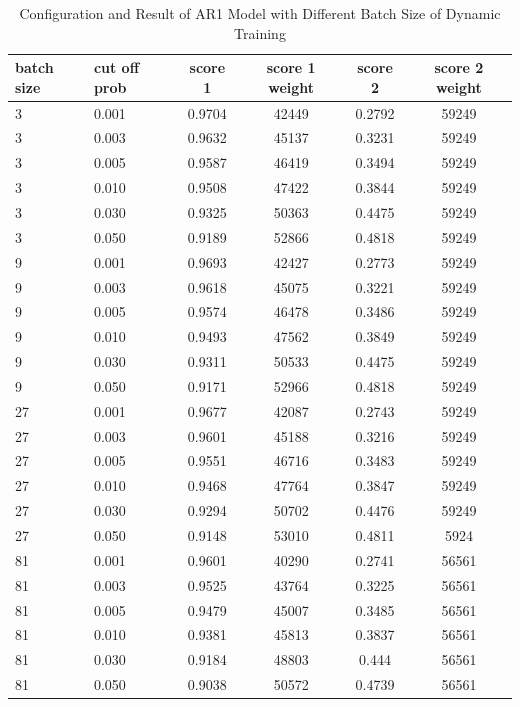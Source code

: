 \documentclass{article}
\begin{document}
\begin{table}[htbp]
  \begin{center}
    \caption{Configuration and Result of AR1 Model with Different Batch Size of Dynamic Training}
    \label{tab:tab1.5.2}
    \begin{tabular}{l|l|*{4}{c}}
      \textbf{batch size} & \textbf{cut off prob} & \textbf{score 1} & \textbf{score 1 weight} & \textbf{score 2} & \textbf{score 2 weight} \\
      \hline
      3 & 0.001 & 0.9704 & 42449 & 0.2792 & 59249\\
      3 & 0.003 & 0.9632 & 45137 & 0.3231 & 59249\\
      3 & 0.005 & 0.9587 & 46419 & 0.3494 & 59249\\
      3 & 0.010 & 0.9508 & 47422 & 0.3844 & 59249\\
      3 & 0.030 & 0.9325 & 50363 & 0.4475 & 59249\\
      3 & 0.050 & 0.9189 & 52866 & 0.4818 & 59249\\
      9 & 0.001 & 0.9693 & 42427 & 0.2773 & 59249\\
      9 & 0.003 & 0.9618 & 45075 & 0.3221 & 59249\\
      9 & 0.005 & 0.9574 & 46478 & 0.3486 & 59249\\
      9 & 0.010 & 0.9493 & 47562 & 0.3849 & 59249\\
      9 & 0.030 & 0.9311 & 50533 & 0.4475 & 59249\\
      9 & 0.050 & 0.9171 & 52966 & 0.4818 & 59249\\
      27 & 0.001 & 0.9677 & 42087 & 0.2743 & 59249\\
      27 & 0.003 & 0.9601 & 45188 & 0.3216 & 59249\\
      27 & 0.005 & 0.9551 & 46716 & 0.3483 & 59249\\
      27 & 0.010 & 0.9468 & 47764 & 0.3847 & 59249\\
      27 & 0.030 & 0.9294 & 50702 & 0.4476 & 59249\\
      27 & 0.050 & 0.9148 & 53010 & 0.4811 & 5924\\
      81 & 0.001 & 0.9601 & 40290 & 0.2741 & 56561\\
      81 & 0.003 & 0.9525 & 43764 & 0.3225 & 56561\\
      81 & 0.005 & 0.9479 & 45007 & 0.3485 & 56561\\
      81 & 0.010 & 0.9381 & 45813 & 0.3837 & 56561\\
      81 & 0.030 & 0.9184 & 48803 & 0.444 & 56561\\
      81 & 0.050 & 0.9038 & 50572 & 0.4739 & 56561\\
    \end{tabular}
  \end{center}
\end{table}
\end{document}
